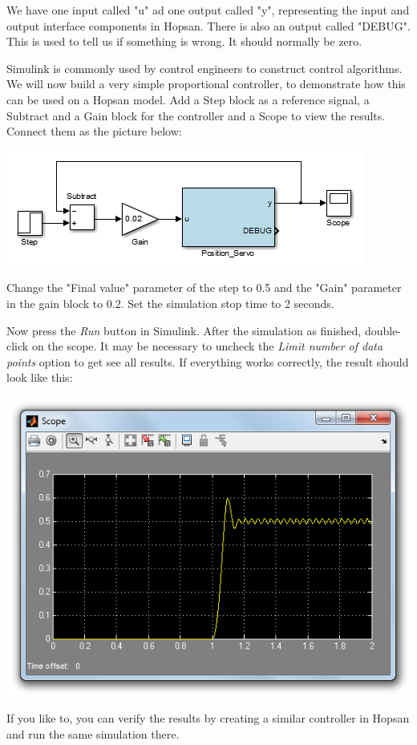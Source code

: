 \documentclass[a4paper]{article}
\begin{document}
\begin{enumerate}
We have one input called "u" ad one output called "y", representing the input and output interface components in Hopsan.
There is also an output called "DEBUG".
This is used to tell us if something is wrong.
It should normally be zero.

Simulink is commonly used by control engineers to construct control algorithms. 
We will now build a very simple proportional controller, to demonstrate how this can be used on a Hopsan model.
Add a Step block as a reference signal, a Subtract and a Gain block for the controller and a Scope to view the results.
Connect them as the picture below:

\includegraphics{gfx/simulink/simulinkfeedback.png}

Change the "Final value" parameter of the step to 0.5 and the "Gain" parameter in the gain block to 0.2. Set the simulation stop time to 2 seconds.

Now press the \textit{Run} button in Simulink. After the simulation as finished, double-click on the scope. It may be necessary to uncheck the \textit{Limit number of data points} option to get see all results. If everything works correctly, the result should look like this:

\includegraphics[width=0.6\linewidth]{gfx/simulink/simulinkplot.png}

If you like to, you can verify the results by creating a similar controller in Hopsan and run the same simulation there.


\end{enumerate}
\end{document}
